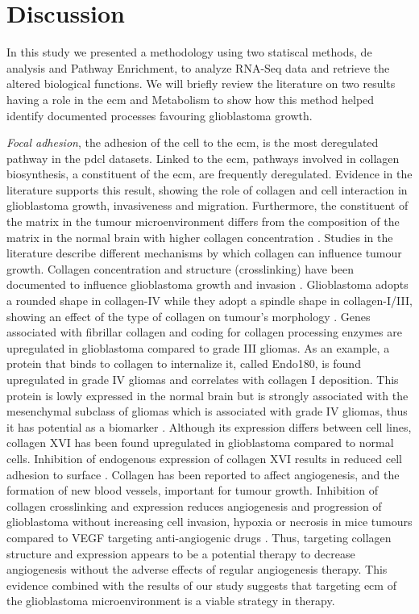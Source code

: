 \section{Discussion}

In this study we presented a methodology using two statiscal methods, \acrlong{de} analysis and Pathway Enrichment, to analyze RNA-Seq data and retrieve the altered biological functions.
We will briefly review the literature on two results having a role in the \acrfull{ecm} and Metabolism to show how this method helped identify documented processes favouring glioblastoma growth.

\textit{Focal adhesion}, the adhesion of the cell to the \acrshort{ecm}, is the most deregulated pathway in the \acrshort{pdcl} datasets.
Linked to the \acrshort{ecm}, pathways involved in collagen biosynthesis, a constituent of the \acrshort{ecm}, are frequently deregulated.
Evidence in the literature supports this result, showing the role of collagen and cell interaction in glioblastoma growth, invasiveness and migration.
Furthermore, the constituent of the matrix in the tumour microenvironment differs from the composition of the matrix in the normal brain with higher collagen concentration \cite*{Mammoto2013}.
Studies in the literature describe different mechanisms by which collagen can influence tumour growth.
Collagen concentration and structure (crosslinking) have been documented to influence glioblastoma growth and invasion \cite*{Kaphle2019,Kaufman2005,Rao2013}. 
Glioblastoma adopts a rounded shape in collagen-IV while they adopt a spindle shape in collagen-I/III, showing an effect of the type of collagen on tumour's morphology \cite*{Rao2013}.
Genes associated with fibrillar collagen and coding for collagen processing enzymes are upregulated in glioblastoma compared to grade III gliomas.
As an example, a protein that binds to collagen to internalize it, called Endo180, is found upregulated in grade IV gliomas and correlates with collagen I deposition. 
This protein is lowly expressed in the normal brain but is strongly associated with the mesenchymal subclass of gliomas which is associated with grade IV gliomas, thus it has potential as a biomarker \cite*{Huijbers2010}.
Although its expression differs between cell lines, collagen XVI has been found upregulated in glioblastoma compared to normal cells.
Inhibition of endogenous expression of collagen XVI results in reduced cell adhesion to surface \cite*{Senner2008}.
Collagen has been reported to affect angiogenesis, and the formation of new blood vessels, important for tumour growth.
Inhibition of collagen crosslinking and expression reduces angiogenesis and progression of glioblastoma without increasing cell invasion, hypoxia or necrosis in mice tumours compared to VEGF targeting anti-angiogenic drugs \cite*{Mammoto2013}.
Thus, targeting collagen structure and expression appears to be a potential therapy to decrease angiogenesis without the adverse effects of regular angiogenesis therapy.
This evidence combined with the results of our study suggests that targeting \acrshort{ecm} of the glioblastoma microenvironment is a viable strategy in therapy.

